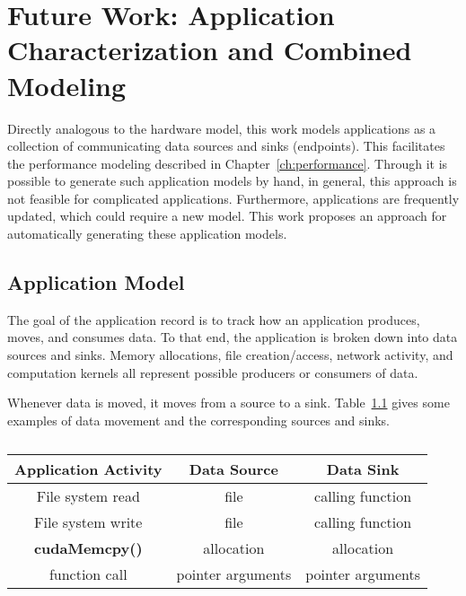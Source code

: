 \chapter{Future Work: Application Characterization and Combined Modeling}
\label{ch:future}


Directly analogous to the hardware model, this work models applications as a collection of communicating data sources and sinks (endpoints).
This facilitates the performance modeling described in Chapter~\ref{ch:performance}.
Through it is possible to generate such application models by hand, in general, this approach is not feasible for complicated applications.
Furthermore, applications are frequently updated, which could require a new model.
This work proposes an approach for automatically generating these application models.

\section{Application Model}

The goal of the application record is to track how an application produces, moves, and consumes data.
To that end, the application is broken down into data sources and sinks.
Memory allocations, file creation/access, network activity, and computation kernels all represent possible producers or consumers of data.

Whenever data is moved, it moves from a source to a sink.
Table~\ref{tab:source-sink-example} gives some examples of data movement and the corresponding sources and sinks.

\begin{table}[h]
    \centering
    \caption{}
    \label{tab:source-sink-example}
    \begin{tabular}{|c|c|c|}
    \hline
    \textbf{Application Activity} & \textbf{Data Source} & \textbf{Data Sink} \\ \hline
    File system read  & file & calling function \\ \hline
    File system write  & file & calling function \\ \hline
    \textbf{cudaMemcpy()} & allocation & allocation \\ \hline
    function call & pointer arguments & pointer arguments \\ \hline
    \end{tabular}
\end{table}

